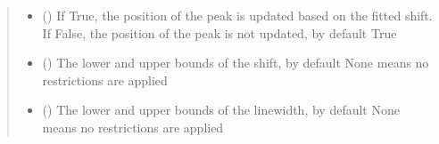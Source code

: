 \documentclass[letterpaper,10pt,english]{sphinxmanual}
\begin{document}
\begin{fulllineitems}
\begin{fulllineitems}
\begin{quote}
\begin{description}
\begin{itemize}
\item {} 
\sphinxAtStartPar
{} (\sphinxstyleliteralemphasis{\sphinxupquote{, }}) \textendash{} If True, the position of the peak is updated based on the fitted shift. If False, the position of the peak is not updated, by default True

\item {} 
\sphinxAtStartPar
{} (\sphinxstyleliteralemphasis{\sphinxupquote{, }}) \textendash{} The lower and upper bounds of the shift, by default None means no restrictions are applied

\item {} 
\sphinxAtStartPar
{} (\sphinxstyleliteralemphasis{\sphinxupquote{, }}) \textendash{} The lower and upper bounds of the linewidth, by default None means no restrictions are applied

\end{itemize}

\end{description}\end{quote}

\end{fulllineitems}


\end{fulllineitems}



\renewcommand{\indexname}{Python Module Index}
\begin{sphinxtheindex}
\let\bigletter\sphinxstyleindexlettergroup
\bigletter{h}
\item\relax{}
\item\relax{}
\end{sphinxtheindex}

\renewcommand{\indexname}{Index}
\printindex
\end{document}
